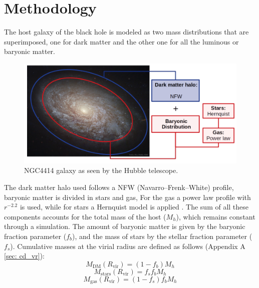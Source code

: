 
%





\chapter{Methodology}
	The host galaxy of the black hole is modeled as two mass distributions that are superimposed, one for dark matter and the other one for all the luminous or baryonic matter.
	\begin{figure}[h]
		\centering
		\includegraphics[width=0.8\linewidth]{Figures/NGC4414_modified}
		\caption{NGC4414 galaxy as seen by the Hubble telescope.}
	\end{figure}
	
	The dark matter halo used follows a NFW (Navarro–Frenk–White) profile, baryonic matter is divided in stars and gas, For the gas a power law profile with $r^{-2.2}$ is used, while for stars a Hernquist model is applied \cite{tanaka2009assembly, choksi2017recoiling}. The sum of all these components accounts for the total mass of the host ($M_h$), which remains constant through a simulation. The amount of baryonic matter is given by the baryonic fraction parameter ($f_b$), and the mass of stars by the stellar fraction parameter ($f_s$). Cumulative masses at the virial radius are defined as follows (Appendix A \autoref{sec: cd_vr}):
	\begin{equation}
		M_\text{DM}(R_\text{vir}) = (1 - f_b)M_h
	\end{equation}
	\begin{equation}
		M_\text{stars}(R_\text{vir}) = f_sf_bM_h
	\end{equation}
	\begin{equation}
		M_\text{gas}(R_\text{vir}) = (1 - f_s)f_bM_h
	\end{equation}
	
